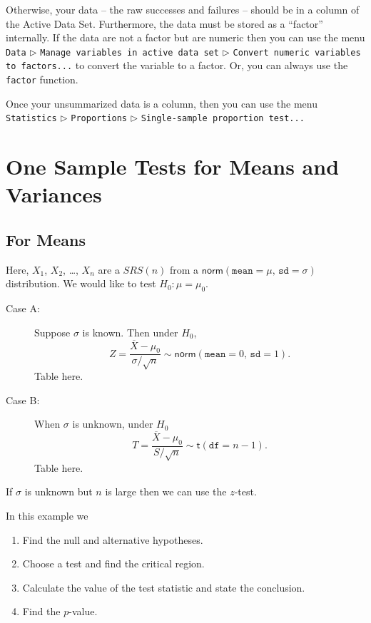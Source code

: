 \documentclass[captions=tableheading]{scrbook}
\begin{document}
Otherwise, your data -- the raw successes and failures -- should be in a column of the Active Data Set. Furthermore, the data must be stored as a ``factor'' internally. If the data are not a factor but are numeric then you can use the menu \texttt{Data} \(\triangleright\) \texttt{Manage variables in active data set} \(\triangleright\) \texttt{Convert numeric variables to factors...} to convert the variable to a factor. Or, you can always use the \texttt{factor} function.

Once your unsummarized data is a column, then you can use the menu \texttt{Statistics} \(\triangleright\) \texttt{Proportions} \(\triangleright\) \texttt{Single-sample proportion test...}
\section{One Sample Tests for Means and Variances}
\label{sec-10-3}
\label{sec-One-Sample-Tests}
\subsection{For Means}
\label{sec-10-3-1}


Here, \(X_{1}\), \(X_{2}\), \ldots{}, \(X_{n}\) are a \(SRS(n)\) from a \(\mathsf{norm}(\mathtt{mean}=\mu,\,\mathtt{sd}=\sigma)\) distribution. We would like to test \(H_{0}:\mu=\mu_{0}\).

\begin{description}
\item[Case A:] Suppose \(\sigma\) is known. Then under \(H_{0}\),
   \[
   Z=\frac{\overline{X}-\mu_{0}}{\sigma/\sqrt{n}}\sim\mathsf{norm}(\mathtt{mean}=0,\,\mathtt{sd}=1).
   \]
   Table here.
\item[Case B:] When \(\sigma\) is unknown, under \(H_{0}\)
   \[
   T = \frac{\overline{X}-\mu_{0}}{S/\sqrt{n}}\sim\mathsf{t}(\mathtt{df}=n-1).
   \]
   Table here.
\end{description}


\begin{rem}
If \(\sigma\) is unknown but \(n\) is large then we can use the \(z\)-test.
\end{rem}

\begin{example}
In this example we
\begin{enumerate}
\item Find the null and alternative hypotheses.
\item Choose a test and find the critical region.
\item Calculate the value of the test statistic and state the conclusion.
\item Find the \(p\)-value.
\end{enumerate}

\end{example}
\end{document}
